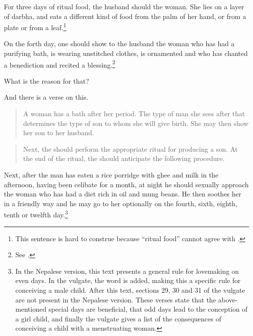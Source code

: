 \begin{translation}
For three days of ritual food, the husband should  the
woman.  She lies on a layer of \gls{darbha}, and eats a different kind of food
from the palm of her hand, or from a plate or from a leaf.\footnote{This
    sentence is hard to construe because  “ritual food” cannot 
    agree
    with .}

On the forth day, one should  show to the husband the woman 
who has
had a purifying bath, is wearing unstitched clothes, is ornamented and who has
chanted a benediction and recited a blessing.\footnote{See \cite[58 and
    fn.\,167]{wuja-2023}.}
    
    What is the reason for that?
     
     
     \item[26]
     And there is a verse on this.
     
     \begin{quote}
         
         A woman has a bath after her period.  The type of man she sees after 
         that determines the type of son to whom she will give birth. She may then 
         show her son to her husband.     
           
     \end{quote}
        
        \item[27]
        
\begin{quote}
            Next, the  should perform the appropriate 
            ritual 
        for producing a son.  At the end of the ritual, the  
        should anticipate the following procedure. 
 
\end{quote}       

\item [28] Next, after the man has eaten a rice porridge with ghee and
milk in the afternoon, having been celibate for a month, at night he
should sexually approach the woman who has had a diet rich in oil and
mung beans.  He then soothes her in a friendly way and he may go to
her optionally on the fourth, sixth, eighth, tenth or twelfth
day.\footnote{In the Nepalese version, this text presents a general
    rule for lovemaking on even days.  In the vulgate, the word
     is added, making this a specific rule for conceiving a
    male child.  After this text, sections 29, 30 and 31 of the vulgate
    are not present in the Nepalese version.  These verses state that the
    above-mentioned special days are beneficial, that odd days lead to the 
    conception of a girl child, and finally the vulgate gives a list of the 
    consequences of conceiving a child with a menstruating woman.}
        

\end{translation}
